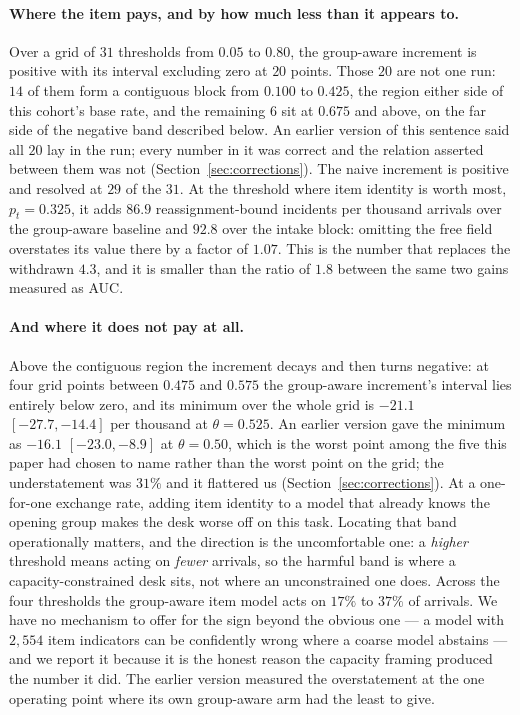 \documentclass[preprint,12pt]{elsarticle}
\begin{document}
\paragraph{Where the item pays, and by how much less than it appears to.}
Over a grid of $31$ thresholds from $0.05$ to $0.80$, the group-aware
increment is positive with its interval excluding zero at $20$ points. Those
$20$ are not one run: $14$ of them form a contiguous block from $0.100$ to
$0.425$, the region either side of this cohort's base rate, and the remaining
$6$ sit at $0.675$ and above, on the far side of the negative band described
below. An earlier version of this sentence said all $20$ lay in the run; every
number in it was correct and the relation asserted between them was not
(Section~\ref{sec:corrections}). The naive increment is positive and resolved
at $29$ of the $31$. At the threshold where item identity is worth most, $p_t=0.325$,
it adds $86.9$ reassignment-bound incidents per thousand arrivals over the
group-aware baseline and $92.8$ over the intake block: omitting the free
field overstates its value there by a factor of $1.07$. This is the number
that replaces the withdrawn $4.3$, and it is smaller than the ratio of
$1.8$ between the same two gains measured as AUC.

\paragraph{And where it does not pay at all.}
Above the contiguous region the increment decays and then turns negative: at
four grid points between $0.475$ and $0.575$ the group-aware increment's
interval lies entirely below zero, and its minimum over the whole grid is
$-21.1$ $[-27.7,-14.4]$ per thousand at $\theta=0.525$. An earlier version
gave the minimum as $-16.1$ $[-23.0,-8.9]$ at $\theta=0.50$, which is the
worst point among the five this paper had chosen to name rather than the worst
point on the grid; the understatement was $31\%$ and it flattered us
(Section~\ref{sec:corrections}). At a one-for-one exchange rate, adding item
identity to a model that already knows the opening group makes the desk worse
off on this task. Locating that band operationally matters, and the direction
is the uncomfortable one: a \emph{higher} threshold means acting on
\emph{fewer} arrivals, so the harmful band is where a capacity-constrained
desk sits, not where an unconstrained one does. Across the four thresholds the
group-aware item model acts on $17\%$ to $37\%$ of arrivals. We have no
mechanism to offer for the sign beyond the obvious one --- a model with
$2{,}554$ item indicators can be confidently wrong where a coarse model
abstains --- and we report it because it is the honest reason the capacity
framing produced the number it did. The earlier version measured the overstatement at the one operating
point where its own group-aware arm had the least to give.
\end{document}
